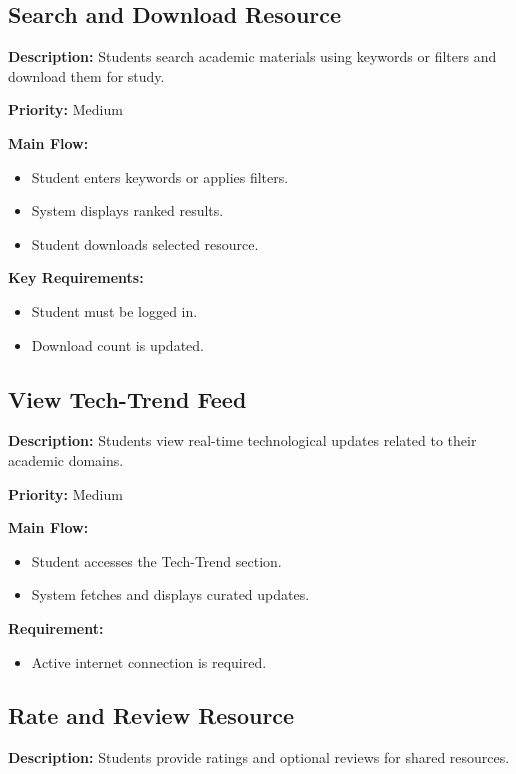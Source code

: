 \documentclass[12pt]{article}
\begin{document}
\subsection{Search and Download Resource}

\textbf{Description:} Students search academic materials using keywords or filters and download them for study.

\textbf{Priority:} Medium

\textbf{Main Flow:}
\begin{itemize}
    \item Student enters keywords or applies filters.
    \item System displays ranked results.
    \item Student downloads selected resource.
\end{itemize}

\textbf{Key Requirements:}
\begin{itemize}
    \item Student must be logged in.
    \item Download count is updated.
\end{itemize}


\subsection{View Tech-Trend Feed}

\textbf{Description:} Students view real-time technological updates related to their academic domains.

\textbf{Priority:} Medium

\textbf{Main Flow:}
\begin{itemize}
    \item Student accesses the Tech-Trend section.
    \item System fetches and displays curated updates.
\end{itemize}

\textbf{Requirement:}
\begin{itemize}
    \item Active internet connection is required.
\end{itemize}


\subsection{Rate and Review Resource}

\textbf{Description:} Students provide ratings and optional reviews for shared resources.
\end{document}
